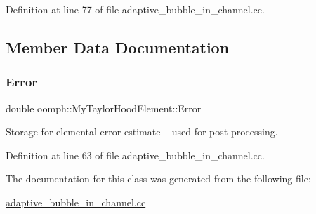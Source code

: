 Definition at line 77 of file adaptive\+\_\+bubble\+\_\+in\+\_\+channel.\+cc.



\subsection{Member Data Documentation}
\mbox{\label{classoomph_1_1MyTaylorHoodElement_a381cf2cdb628fb7aacfd6dd59dc2996b}} 
\subsubsection{\texorpdfstring{Error}{Error}}
{\footnotesize\ttfamily double oomph\+::\+My\+Taylor\+Hood\+Element\+::\+Error\hspace{0.3cm}{\ttfamily [private]}}



Storage for elemental error estimate -- used for post-\/processing. 



Definition at line 63 of file adaptive\+\_\+bubble\+\_\+in\+\_\+channel.\+cc.



The documentation for this class was generated from the following file\+:\begin{DoxyCompactItemize}
\item 
\hyperlink{adaptive__bubble__in__channel_8cc}{adaptive\+\_\+bubble\+\_\+in\+\_\+channel.\+cc}\end{DoxyCompactItemize}
